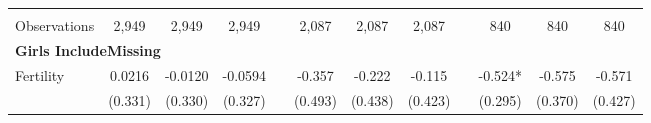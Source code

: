 \begin{landscape}
\begin{table}[htpb!]
\begin{center}
\begin{tabular}{lcccp{2mm}cccp{2mm}ccc}
\begin{footnotesize}\end{footnotesize}&\begin{footnotesize}\end{footnotesize}&\begin{footnotesize}\end{footnotesize}&\begin{footnotesize}\end{footnotesize}&\begin{footnotesize}\end{footnotesize}&\begin{footnotesize}\end{footnotesize}&\begin{footnotesize}\end{footnotesize}&\begin{footnotesize}\end{footnotesize}&\begin{footnotesize}\end{footnotesize}&\begin{footnotesize}\end{footnotesize}&\begin{footnotesize}\end{footnotesize}&\begin{footnotesize}\end{footnotesize}\\Observations&2,949&2,949&2,949&&2,087&2,087&2,087&&840&840&840\\
\multicolumn{12}{l}{\textbf{Girls IncludeMissing}}\\ 
Fertility&0.0216&-0.0120&-0.0594&&-0.357&-0.222&-0.115&&-0.524*&-0.575&-0.571\\
&(0.331)&(0.330)&(0.327)&&(0.493)&(0.438)&(0.423)&&(0.295)&(0.370)&(0.427)\\

\end{tabular}
\end{center}
\end{table}
\end{landscape}
